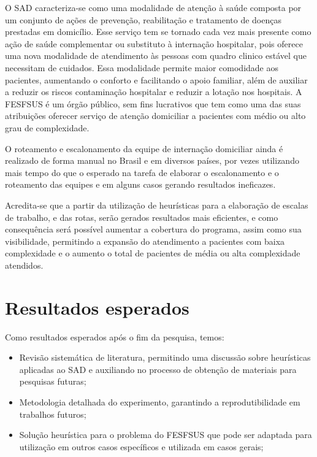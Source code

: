 { }%


O \ac{SAD} caracteriza-se como uma modalidade de atenção à saúde composta por um conjunto de ações de prevenção, reabilitação e tratamento de doenças prestadas em domicílio.
Esse serviço tem se tornado cada vez mais presente como ação de saúde complementar ou substituto à internação hospitalar, pois oferece uma nova modalidade de atendimento às pessoas com quadro clinico estável que necessitam de cuidados.
Essa modalidade permite maior comodidade aos pacientes, aumentando o conforto e facilitando o apoio familiar, além de auxiliar a reduzir os riscos contaminação hospitalar e reduzir a lotação nos hospitais. 
A \ac{FESFSUS} é um órgão público, sem fins lucrativos que tem como uma das suas atribuições oferecer serviço de atenção domiciliar a pacientes com médio ou alto grau de complexidade.

O roteamento e escalonamento da equipe de internação domiciliar ainda é realizado de forma manual no Brasil e em diversos países, por vezes utilizando mais tempo do que o esperado na tarefa de elaborar o escalonamento e o roteamento das equipes e em alguns casos gerando resultados ineficazes.

Acredita-se que a partir da utilização de heurísticas para a elaboração de escalas de trabalho, e das rotas, serão gerados resultados mais eficientes, e como consequência será possível aumentar a cobertura do programa, assim como sua visibilidade, permitindo a expansão do atendimento a pacientes com baixa complexidade e o aumento o total de pacientes de média ou alta complexidade atendidos.  

\section{Resultados esperados}

Como resultados esperados após o fim da pesquisa, temos:

\begin{itemize}
\item Revisão sistemática de literatura, permitindo uma discussão sobre heurísticas aplicadas ao \ac{SAD} e auxiliando no processo de obtenção de materiais para pesquisas futuras;
\item Metodologia detalhada do experimento, garantindo a reprodutibilidade em trabalhos futuros;
\item Solução heurística para o problema do \ac{FESFSUS} que pode ser adaptada para utilização em outros casos específicos e utilizada em casos gerais;
\end{itemize}


